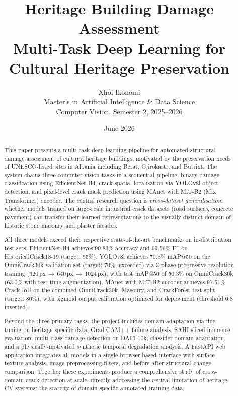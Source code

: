 \documentclass[12pt,a4paper]{article}
\title{%
  \textbf{Heritage Building Damage Assessment}\\[0.5em]
  \large Multi-Task Deep Learning for Cultural Heritage Preservation
}
\author{%
  Xhoi Ikonomi\\[0.2em]
  \small Master's in Artificial Intelligence \& Data Science\\
  \small Computer Vision, Semester 2, 2025--2026
}
\date{June 2026}
\begin{document}
\maketitle
\thispagestyle{fancy}

\begin{abstract}
\noindent
This paper presents a multi-task deep learning pipeline for automated structural damage assessment of cultural heritage buildings, motivated by the preservation needs of UNESCO-listed sites in Albania including Berat, Gjirokastr, and Butrint. The system chains three computer vision tasks in a sequential pipeline: binary damage classification using EfficientNet-B4, crack spatial localisation via YOLOv8l object detection, and pixel-level crack mask prediction using MAnet with MiT-B2 (Mix Transformer) encoder. The central research question is \textit{cross-dataset generalisation}: whether models trained on large-scale industrial crack datasets (road surfaces, concrete pavement) can transfer their learned representations to the visually distinct domain of historic stone masonry and plaster facades.

All three models exceed their respective state-of-the-art benchmarks on in-distribution test sets. EfficientNet-B4 achieves 99.83\% accuracy and 99.56\% F1 on HistoricalCrack18-19 (target: 95\%). YOLOv8l achieves 70.3\% mAP@50 on the OmniCrack30k validation set (target: 70\%, exceeded) via 3-phase progressive resolution training (320\,px\,$\to$\,640\,px\,$\to$\,1024\,px), with test mAP@50 of 50.3\% on OmniCrack30k (63.0\% with test-time augmentation). MAnet with MiT-B2 encoder achieves 97.51\% Crack IoU on the combined OmniCrack30k, Masonry, and CrackForest test split (target: 80\%), with sigmoid output calibration optimised for deployment (threshold 0.8 inverted).

Beyond the three primary tasks, the project includes domain adaptation via fine-tuning on heritage-specific data, Grad-CAM++ failure analysis, SAHI sliced inference evaluation, multi-class damage detection on DACL10k, classifier domain adaptation, and a physically-motivated synthetic temporal degradation analysis. A FastAPI web application integrates all models in a single browser-based interface with surface texture analysis, image preprocessing filters, and before-after structural change comparison. Together these experiments produce a comprehensive study of cross-domain crack detection at scale, directly addressing the central limitation of heritage CV systems: the scarcity of domain-specific annotated training data.
\end{abstract}
\end{document}
